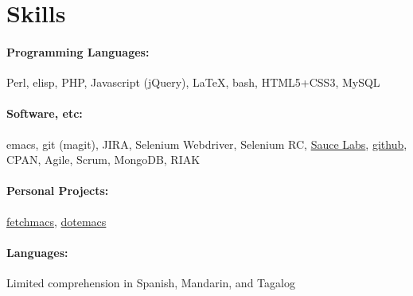 \section{Skills}
%
\paragraph{Programming Languages:} Perl, elisp, PHP, Javascript (jQuery), \LaTeX, bash, HTML5+CSS3, MySQL
\paragraph{Software, etc:} emacs, git (magit), JIRA, Selenium Webdriver, Selenium RC, \href{http://www.saucelabs.com}{Sauce Labs}, \href{http://www.github.com/gempesaw}{github}, CPAN, Agile, Scrum, MongoDB, RIAK
\paragraph{Personal Projects:} \href{http://github.com/gempesaw/fetchmacs}{fetchmacs}, \href{http://github.com/gempesaw/fetchmacs}{dotemacs}
\paragraph{Languages:} Limited comprehension in Spanish, Mandarin, and Tagalog
